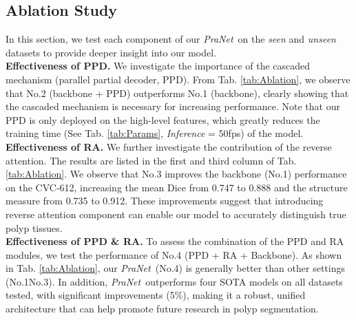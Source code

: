 \documentclass[runningheads]{llncs}
\newcommand{\tabref}[1]{Tab. \ref{#1}}
\def\ourmodel{\textit{PraNet}}
\begin{document}
 

\subsection{Ablation Study}\label{sec:ablation}
In this section, we test each component of our \ourmodel~on the \textit{seen} and \textit{unseen} datasets to provide deeper insight into our model. \\
\noindent\textbf{Effectiveness of PPD.} 
We investigate the importance of the cascaded mechanism (parallel partial decoder, PPD). From \tabref{tab:Ablation}, we observe that No.2 (backbone + PPD) outperforms No.1 (backbone), clearly showing that the cascaded mechanism is necessary for increasing performance. Note that our PPD is only deployed on the high-level features, which greatly reduces the training time (See \tabref{tab:Params}, \textit{Inference} = 50fps) of the model. \\
\noindent\textbf{Effectiveness of RA.} We further investigate the contribution of the reverse attention. The results are listed in the first and third column of \tabref{tab:Ablation}. We observe that No.3 improves the backbone (No.1) performance on the CVC-612, increasing the mean Dice from 0.747 to 0.888 and the structure measure  from 0.735 to 0.912. These improvements suggest that introducing reverse attention component can enable our model to accurately distinguish true polyp tissues. \\
\noindent\textbf{Effectiveness of PPD \& RA.} To assess the combination of the PPD and RA modules, we test the performance of No.4 (PPD + RA + Backbone). As shown in \tabref{tab:Ablation}, our \ourmodel~(No.4) is generally better than other settings (No.1No.3). 
In addition, \ourmodel~outperforms four SOTA models on all datasets tested, with significant improvements (5\%), making it a robust, unified architecture that can help promote future research in polyp segmentation. 

 
\end{document}
